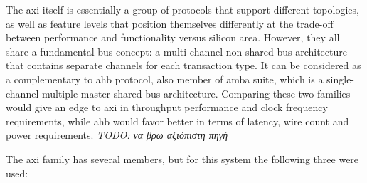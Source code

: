 \label{amba}
The \gls{axi} itself is essentially a group of protocols that support different topologies,
as well as feature levels that position themselves differently at the trade-off 
between performance and functionality versus silicon area.
However, they all share a fundamental bus concept: 
a multi-channel non shared-bus architecture that contains separate
channels for each \gls{transaction} type. It can be considered as a complementary
to \gls{ahb} protocol, also member of \gls{amba} suite, 
which is a single-channel multiple-master shared-bus architecture. 
Comparing these two families would give an edge to \gls{axi} in
throughput performance and clock frequency requirements, while \gls{ahb} would favor
better in terms of latency, wire count and power requirements. 
\emph{TODO: να βρω αξιόπιστη πηγή}

The \gls{axi} family has several members, but for this system the following three were used:
